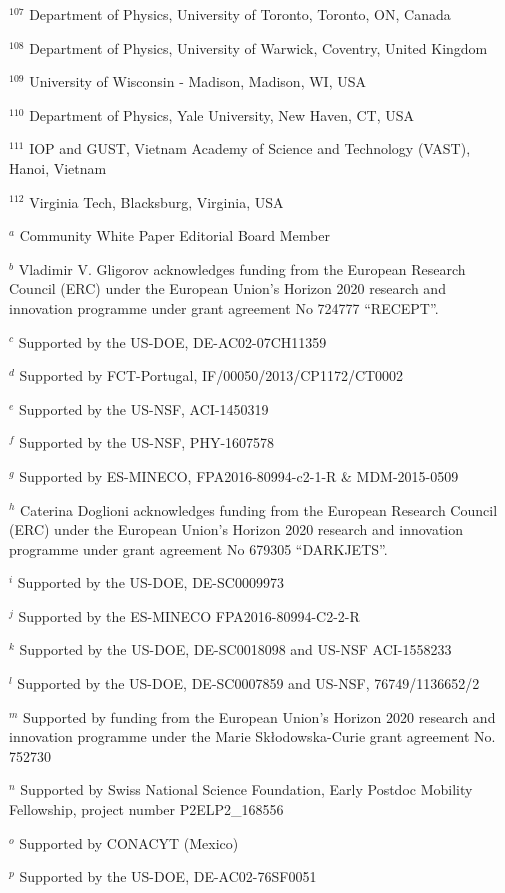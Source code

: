 \par {\footnotesize $^{107}$ Department of Physics, University of Toronto, Toronto, ON, Canada}
\par {\footnotesize $^{108}$ Department of Physics, University of Warwick, Coventry, United Kingdom}
\par {\footnotesize $^{109}$ University of Wisconsin - Madison, Madison, WI, USA}
\par {\footnotesize $^{110}$ Department of Physics, Yale University, New Haven, CT, USA}
\par {\footnotesize $^{111}$ IOP and GUST, Vietnam Academy of Science and Technology (VAST), Hanoi, Vietnam}
\par {\footnotesize $^{112}$ Virginia Tech, Blacksburg, Virginia, USA}
\bigskip
\par {\footnotesize $^{a}$ Community White Paper Editorial Board Member}
\par {\footnotesize $^{b}$ Vladimir V. Gligorov acknowledges funding from the European Research Council (ERC) under the European Union's Horizon 2020 research and innovation programme under grant agreement No 724777 “RECEPT”.}
\par {\footnotesize $^{c}$ Supported by the US-DOE, DE-AC02-07CH11359}
\par {\footnotesize $^{d}$ Supported by FCT-Portugal, IF/00050/2013/CP1172/CT0002}
\par {\footnotesize $^{e}$ Supported by the US-NSF, ACI-1450319}
\par {\footnotesize $^{f}$ Supported by the US-NSF, PHY-1607578}
\par {\footnotesize $^{g}$ Supported by ES-MINECO, FPA2016-80994-c2-1-R \& MDM-2015-0509}
\par {\footnotesize $^{h}$ Caterina Doglioni acknowledges funding from the European Research Council (ERC) under the European Union's Horizon 2020 research and innovation programme under grant agreement No 679305 “DARKJETS”.}
\par {\footnotesize $^{i}$ Supported by the US-DOE, DE-SC0009973}
\par {\footnotesize $^{j}$ Supported by the ES-MINECO FPA2016-80994-C2-2-R}
\par {\footnotesize $^{k}$ Supported by the US-DOE, DE-SC0018098 and US-NSF ACI-1558233}
\par {\footnotesize $^{l}$ Supported by the US-DOE, DE-SC0007859 and US-NSF, 76749/1136652/2}
\par {\footnotesize $^{m}$ Supported by funding from the European Union’s Horizon 2020 research and innovation programme under the Marie Skłodowska-Curie grant agreement No. 752730}
\par {\footnotesize $^{n}$ Supported by Swiss National Science Foundation, Early Postdoc Mobility Fellowship, project number P2ELP2\_168556}
\par {\footnotesize $^{o}$ Supported by CONACYT (Mexico)}
\par {\footnotesize $^{p}$ Supported by the US-DOE, DE-AC02-76SF0051}
